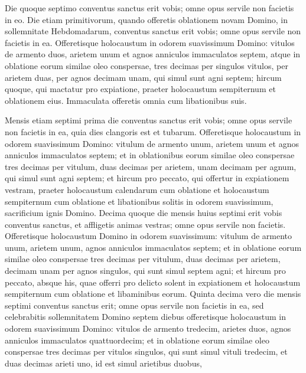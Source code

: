 \begin{biblechapter}
\verse Die quoque septimo conventus sanctus erit vobis; omne opus servile non facietis in eo. 
\verse Die etiam primitivorum, quando offeretis oblationem novam Domino, in sollemnitate Hebdomadarum, conventus sanctus erit vobis; omne opus servile non facietis in ea. 
\verse Offeretisque holocaustum in odorem suavissimum Domino: vitulos de armento duos, arietem unum et agnos anniculos immaculatos septem,  
\verse atque in oblatione eorum similae oleo conspersae, tres decimas per singulos vitulos, per arietem duas, 
\verse per agnos decimam unam, qui simul sunt agni septem; 
\verse hircum quoque, qui mactatur pro expiatione, 
\verse praeter holocaustum sempiternum et oblationem eius. Immaculata offeretis omnia cum libationibus suis. 
\end{biblechapter}

\begin{biblechapter}  
\verse Mensis etiam septimi prima die conventus sanctus erit vobis; omne opus servile non facietis in ea, quia dies clangoris est et tubarum. 
\verse Offeretisque holocaustum in odorem suavissimum Domino: vitulum de armento unum, arietem unum et agnos anniculos immaculatos septem; 
\verse et in oblationibus eorum similae oleo conspersae tres decimas per vitulum, duas decimas per arietem, 
\verse unam decimam per agnum, qui simul sunt agni septem; 
\verse et hircum pro peccato, qui offertur in expiationem vestram, 
\verse praeter holocaustum calendarum cum oblatione et holocaustum sempiternum cum oblatione et libationibus solitis in odorem suavissimum, sacrificium ignis Domino. 
\verse Decima quoque die mensis huius septimi erit vobis conventus sanctus, et affligetis animas vestras; omne opus servile non facietis. 
\verse Offeretisque holocaustum Domino in odorem suavissimum: vitulum de armento unum, arietem unum, agnos anniculos immaculatos septem; 
\verse et in oblatione eorum similae oleo conspersae tres decimas per vitulum, duas decimas per arietem, 
\verse decimam unam per agnos singulos, qui sunt simul septem agni; 
\verse et hircum pro peccato, absque his, quae offerri pro delicto solent in expiationem et holocaustum sempiternum cum oblatione et libaminibus eorum. 
\verse Quinta decima vero die mensis septimi conventus sanctus erit; omne opus servile non facietis in ea, sed celebrabitis sollemnitatem Domino septem diebus 
\verse offeretisque holocaustum in odorem suavissimum Domino: vitulos de armento tredecim, arietes duos, agnos anniculos immaculatos quattuordecim; 
\verse et in oblatione eorum similae oleo conspersae tres decimas per vitulos singulos, qui sunt simul vituli tredecim, et duas decimas arieti uno, id est simul arietibus duobus, 

\end{biblechapter}

